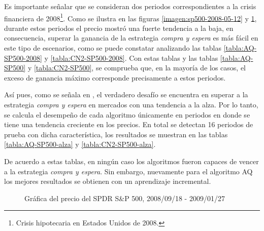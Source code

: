 \documentclass[12pt]{report}
\theoremstyle{break}
\theoremstyle{break}
\begin{document}
Es importante señalar que se consideran dos periodos correspondientes a la crisis financiera de 2008\footnote{Crisis hipotecaria en Estados Unidos de 2008.}. Como se ilustra en las figuras \ref{imagen:sp500-2008-05-12} y \ref{imagen:sp500-2008-09-18}, durante estos periodos el precio mostró una fuerte tendencia a la baja, en consecuencia, superar la ganancia de la estrategia \textit{compra y espera} es más fácil en este tipo de escenarios, como se puede constatar analizando las tablas \ref{tabla:AQ-SP500-2008} y \ref{tabla:CN2-SP500-2008}. Con estas tablas y las tablas \ref{tabla:AQ-SP500} y \ref{tabla:CN2-SP500}, se comprueba que, en la mayoría de los casos, el exceso de ganancia máximo corresponde precisamente a estos periodos.

Así pues, como se señala en \cite{Lohpetch2010}, el verdadero desafío se encuentra en superar a la estrategia \textit{compra y espera} en mercados con una tendencia a la alza. Por lo tanto, se calcula el desempeño de cada algoritmo únicamente en periodos en donde se tiene una tendencia creciente en los precios. En total se detectan 16 periodos de prueba con dicha característica, los resultados se muestran en las tablas \ref{tabla:AQ-SP500-alza} y \ref{tabla:CN2-SP500-alza}.

De acuerdo a estas tablas, en ningún caso los algoritmos fueron capaces de vencer a la estrategia \textit{compra y espera}. Sin embargo, nuevamente para el algoritmo AQ los mejores resultados se obtienen con un aprendizaje incremental.
\begin{figure}[htbp]
\centering
{}
\caption{\label{imagen:sp500-2008-09-18} Gráfica del precio del SPDR S\&P 500, 2008/09/18 - 2009/01/27}
\end{figure}
\end{document}
